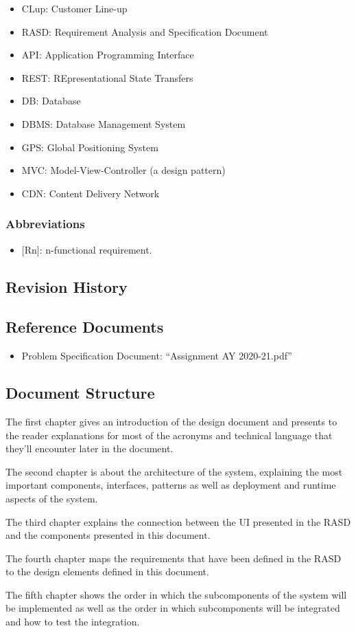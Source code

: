 \begin{itemize}
    \item CLup: Customer Line-up
    \item RASD: Requirement Analysis and Specification Document
    \item API: Application Programming Interface
    \item REST: REpresentational State Transfers
    \item DB: Database
    \item DBMS: Database Management System
    \item GPS: Global Positioning System
    \item MVC: Model-View-Controller (a design pattern)
    \item CDN: Content Delivery Network
\end{itemize}


\subsubsection{Abbreviations}

\begin{itemize}
    \item {[Rn]}: n-functional requirement.
\end{itemize}

\subsection{Revision History}

\subsection{Reference Documents}

\begin{itemize}
    \item Problem Specification Document: ``Assignment AY 2020-21.pdf''
\end{itemize}

\subsection{Document Structure}

The first chapter gives an introduction of the design document and presents to the reader explanations for most of the acronyms and technical language that they'll encounter later in the document.

The second chapter is about the architecture of the system, explaining the most important components, interfaces, patterns as well as deployment and runtime aspects of the system.

The third chapter explains the connection between the UI presented in the RASD and the components presented in this document.

The fourth chapter maps the requirements that have been defined in the RASD to the design elements defined in this document.

The fifth chapter shows the order in which the subcomponents of the system will be implemented as well as the order in which subcomponents will be integrated and how to test the integration. 